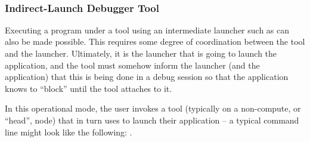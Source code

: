 {\large {}}

{\large {}}

{\large {}}

{\large {}}

{\large {}}




 \\

\subsubsection{Indirect-Launch Debugger Tool}

Executing a program under a tool using an intermediate launcher such as  can also be made possible. This requires some degree of coordination between the tool and the launcher. Ultimately, it is the launcher that is going to launch the application, and the tool must somehow inform the launcher (and the application) that this is being done in a debug session so that the application knows to ``block'' until the tool attaches to it.

In this operational mode, the user invokes a tool (typically on a non-compute, or ``head'', node) that in turn uses  to launch their application – a typical command line might look like the following: .

